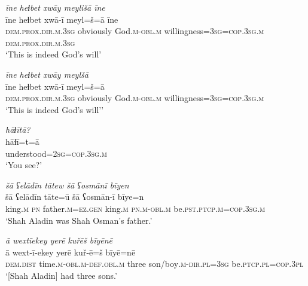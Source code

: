 \ea \label{PM.51}
\textit{īne heɫbet xwāy meylišā īne} \\ 
\gll īne heɫbet xwā-ī meyl=š=ā īne \\ 
 \textsc{dem.prox}\textsc{.dir}\textsc{.m}\textsc{.3sg} obviously God\textsc{.m}\textsc{-obl}\textsc{.m} willingness\textsc{=3sg}\textsc{=cop}\textsc{.3sg}\textsc{.m} \textsc{dem.prox}\textsc{.dir}\textsc{.m}\textsc{.3sg} \\ 
\glt `This is indeed God’s will'
\z 
 
\ea \label{PM.52}
\textit{īne heɫbet xwāy meylšā} \\ 
\gll īne heɫbet xwā-ī meyl=š=ā \\ 
 \textsc{dem.prox}\textsc{.dir}\textsc{.m}\textsc{.3sg} obviously God\textsc{.m}\textsc{-obl}\textsc{.m} willingness\textsc{=3sg}\textsc{=cop}\textsc{.3sg}\textsc{.m} \\ 
\glt `This is indeed God’s will’'
\z 
 
\ea \label{PM.53}
\textit{hāɫītā?} \\ 
\gll hāɫī=t=ā \\ 
 understood\textsc{=\textsc{2sg}}\textsc{=cop}\textsc{.3sg}\textsc{.m} \\ 
\glt `You see?'
\z 

 
\ea \label{DG.2}
\textit{šā ʕelādīn tātew šā ʕosmānī bīyen} \\ 
\gll šā ʕelādīn tāte=ū šā ʕosmān-ī bīye=n \\ 
 king\textsc{.m} \textsc{pn} father\textsc{.m}\textsc{=ez}\textsc{.gen} king\textsc{.m} \textsc{pn}\textsc{.m}\textsc{-obl}\textsc{.m} be\textsc{.pst}\textsc{.ptcp}\textsc{.m}\textsc{=cop}\textsc{.3sg}\textsc{.m} \\ 
\glt `Shah Aladin was Shah Osman’s father.'
\z 
 
\ea \label{DG.3}
\textit{ā wextīekey yerē kuřēš bīyēnē} \\ 
\gll ā wext-ī-ekey yerē kuř-ē=š bīyē=nē \\ 
 \textsc{dem.dist} time\textsc{.m}\textsc{-obl}\textsc{.m}\textsc{-def}\textsc{.obl}\textsc{.m} three son/boy\textsc{.m}\textsc{-dir}\textsc{.pl}\textsc{=3sg} be\textsc{.ptcp}\textsc{.pl}\textsc{=cop}\textsc{.3pl} \\ 
\glt `[Shah Aladin] had three sons.'
\z 
 
